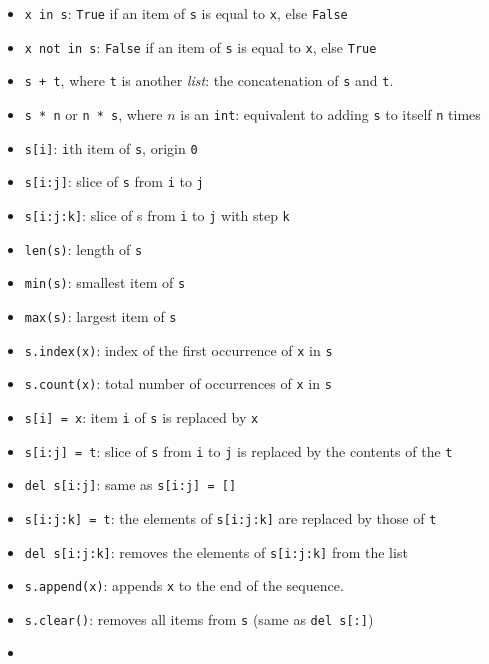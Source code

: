 \documentclass[12pt]{article} \newif\ifsolution\solutiontrue %
\begin{document}
\begin{itemize}
\item
  \texttt{x\ in\ s}: \texttt{True} if an item of \texttt{s} is equal to
  \texttt{x}, else \texttt{False}
\item
  \texttt{x\ not\ in\ s}: \texttt{False} if an item of \texttt{s} is
  equal to \texttt{x}, else \texttt{True}
\item
  \texttt{s\ +\ t}, where \texttt{t} is another \emph{list}: the concatenation of \texttt{s} and \texttt{t}.
\item
  \texttt{s\ *\ n} or \texttt{n\ *\ s}, where $n$ is an \texttt{int}: equivalent to adding \texttt{s}
  to itself \texttt{n} times
\item
  \texttt{s{[}i{]}}: \texttt{i}th item of \texttt{s}, origin \texttt{0}
\item
  \texttt{s{[}i:j{]}}: slice of \texttt{s} from \texttt{i} to \texttt{j}
\item
  \texttt{s{[}i:j:k{]}}: slice of s from \texttt{i} to \texttt{j} with
  step \texttt{k}
\item
  \texttt{len(s)}: length of \texttt{s}
\item
  \texttt{min(s)}: smallest item of \texttt{s}
\item
  \texttt{max(s)}: largest item of \texttt{s}
\item
  \texttt{s.index(x)}: index of the first occurrence of \texttt{x} in
  \texttt{s}
\item
  \texttt{s.count(x)}: total number of occurrences of \texttt{x} in
  \texttt{s}
\item
  \texttt{s{[}i{]}\ =\ x}: item \texttt{i} of \texttt{s} is replaced by
  \texttt{x}
\item
  \texttt{s{[}i:j{]}\ =\ t}: slice of \texttt{s} from \texttt{i} to
  \texttt{j} is replaced by the contents of the \texttt{t}
\item
  \texttt{del\ s{[}i:j{]}}: same as \texttt{s{[}i:j{]}\ =\ {[}{]}}
\item
  \texttt{s{[}i:j:k{]}\ =\ t}: the elements of \texttt{s{[}i:j:k{]}} are
  replaced by those of \texttt{t}
\item
  \texttt{del\ s{[}i:j:k{]}}: removes the elements of
  \texttt{s{[}i:j:k{]}} from the list
\item
  \texttt{s.append(x)}: appends \texttt{x} to the end of the sequence.
\item
  \texttt{s.clear()}: removes all items from \texttt{s} (same as
  \texttt{del\ s{[}:{]}})
\item

\end{itemize}
\end{document}
